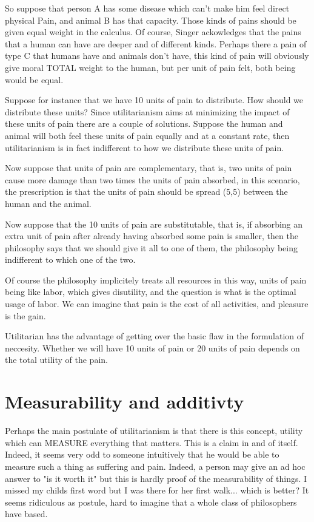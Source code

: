 \documentclass[12pt]{report}
\numberwithin{equation}{section}
\begin{document}

So suppose that person A has some disease which can't make him feel direct physical Pain, and animal B has that capacity. Those kinds of pains should be given equal weight in the calculus. Of course, Singer ackowledges that the pains that a human can have are deeper and of different kinds. Perhaps there a pain of type C that humans have and animals don't have, this kind of pain will obviously give moral TOTAL weight to the human, but per unit of pain felt, both being would be equal. 

Suppose for instance that we have 10 units of pain to distribute. How should we distribute these units? Since utilitarianism aims at minimizing the impact of these units of pain there are a couple of solutions. Suppose the human and animal will both feel these units of pain equally and at a constant rate, then utilitarianism is in fact indifferent to how we distribute these units of pain. 

Now suppose that units of pain are complementary, that is, two units of pain cause more damage than two times the units of pain absorbed, in this scenario, the prescription is that the units of pain should be spread (5,5) between the human and the animal. 

Now suppose that the 10 units of pain are substitutable, that is, if absorbing an extra unit of pain after already having absorbed some pain is smaller, then the philosophy says that we should give it all to one of them, the philosophy being indifferent to which one of the two. 

Of course the philosophy implicitely treats all resources in this way, units of pain being like labor, which gives disutility, and the question is what is the optimal usage of labor. We can imagine that pain is the cost of all activities, and pleasure is the gain. 

Utilitarian has the advantage of getting over the basic flaw in the formulation of neccesity. Whether we will have 10 units of pain or 20 units of pain depends on the total utility of the pain. 

\section{Measurability and additivty}

Perhaps the main postulate of utilitarianism is that there is this concept, utility which can MEASURE everything that matters. This is a claim in and of itself. Indeed, it seems very odd to someone intuitively that he would be able to measure such a thing as suffering and pain. Indeed, a person may give an ad hoc answer to "is it worth it" but this is hardly proof of the measurability of things. I missed my childs first word but I was there for her first walk... which is better? It seems ridiculous as postule, hard to imagine that a whole class of philosophers have based. 
\end{document}
